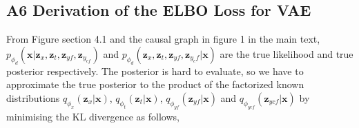 \documentclass{amia}
\begin{document}
\subsection*{A6 Derivation of the ELBO Loss for VAE} 
\label{ELBO_Loss_derivation}


From Figure section 4.1 and the causal graph in figure 1 in the main text, $p_{\phi_d}(\textbf{x}|\textbf{z}_x, \textbf{z}_t, \textbf{z}_{yf}, \textbf{z}_{y_{cf}})$ and 
$p_{\phi_d}(\textbf{z}_x, \textbf{z}_t, \textbf{z}_{yf}, \textbf{z}_{y_cf}|\textbf{x})$ are the true likelihood and true posterior respectively. The posterior is hard to evaluate, so we have to approximate the true posterior to the product of the factorized known distributions $q_{\phi_x}(\textbf{z}_x|\textbf{x})$, $q_{\phi_t}(\textbf{z}_t|\textbf{x})$, $q_{\phi_{yf}}(\textbf{z}_{yf}|\textbf{x})$ and $q_{\phi_{ycf}}(\textbf{z}_{ycf}|\textbf{x})$ by minimising the KL divergence as follows,
\end{document}
